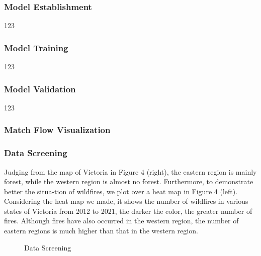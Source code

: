 \documentclass[12pt]{article}  %
\begin{document}
\subsubsection{Model Establishment}
123

\subsubsection{Model Training}
123

\subsubsection{Model Validation}
123

\subsubsection{Match Flow Visualization}



\subsubsection{Data Screening}
Judging from the map of Victoria in Figure 4 (right), the eastern region is mainly forest, while the western region is almost no forest. Furthermore, to demonstrate better the situa-tion of wildfires, we plot over a heat map in Figure 4 (left).
Considering the heat map we made, it shows the number of wildfires in various states of Victoria from 2012 to 2021, the darker the color, the greater number of fires. Although fires have also occurred in the western region, the number of eastern regions is much higher than that in the western region. 

\begin{figure}[htbp]
    \centering    
	\caption{Data Screening} %
\end{figure}
\end{document}
